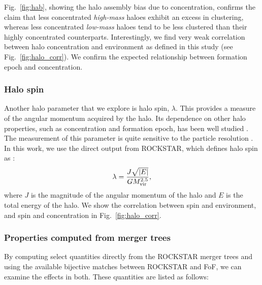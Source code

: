 \documentclass[fleqn,usenatbib]{mnras}
\begin{document}
Fig.~\ref{fig:hab}, showing the halo assembly bias due to concentration, confirms the claim that less concentrated \textit{high-mass} haloes exhibit an excess in clustering, whereas less concentrated \textit{low-mass} haloes tend to be less clustered than their highly concentrated counterparts. Interestingly, we find very weak correlation between halo concentration and environment as defined in this study (see Fig.~\ref{fig:halo_corr}). We confirm the expected relationship between formation epoch and concentration.

\subsubsection{Halo spin}
Another halo parameter that we explore is halo spin, $\lambda$. This provides a measure of the angular momentum acquired by the halo. Its dependence on other halo properties, such as concentration and formation epoch, has been well studied \citep{2001ApJ...555..240B,2007MNRAS.376..215B,2016MNRAS.462..893R,2019MNRAS.486.1156J}. The measurement of this parameter is quite sensitive to the particle resolution \citep[the smaller the number of particles in a halo, the larger the error,][]{2014MNRAS.437.1894O,2017MNRAS.471.2871B}. In this work, we use the direct output from \textsc{ROCKSTAR}, which defines halo spin as \citet{1969ApJ...155..393P}:
\begin{equation}
    \lambda = \frac{J \sqrt{|E|}}{G M^{2.5}_{\rm vir}},
\end{equation}
where $J$ is the magnitude of the angular momentum of the halo and $E$ is the total energy of the halo. We show the correlation between spin and environment, and spin and concentration in Fig.~\ref{fig:halo_corr}.

\subsubsection{Properties computed from merger trees}
By computing select quantities directly from the \textsc{ROCKSTAR} merger trees and using the available bijective matches between \textsc{ROCKSTAR} and FoF, we can examine the effects in both. These quantities are listed as follows:
\end{document}
